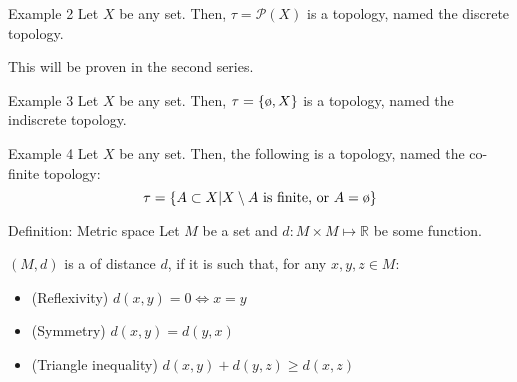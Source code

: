 \documentclass[a4paper]{article}
\begin{document}
\begin{parag}{Example 2}
    Let $X$ be any set. Then, $\tau = \mathcal{P}\left(X\right)$ is a topology, named the discrete topology.

    This will be proven in the second series.
\end{parag}

\begin{parag}{Example 3}
    Let $X$ be any set. Then, $\tau = \left\{\o, X\right\}$ is a topology, named the indiscrete topology.
\end{parag}

\begin{parag}{Example 4}
    Let $X$ be any set. Then, the following is a topology, named the co-finite topology: 
    \[\tau = \left\{A \subset X | X \setminus A \text{ is finite, or } A = \o\right\}\]
\end{parag}

\begin{parag}{Definition: Metric space}
   Let $M$ be a set and $d: M \times M \mapsto \mathbb{R}$ be some function.

   $\left(M, d\right)$ is a  of distance $d$, if it is such that, for any $x,y,z \in M$:
   \begin{itemize}
       \item (Reflexivity) $d\left(x, y\right) = 0 \iff x = y$
       \item (Symmetry) $d\left(x, y\right) = d\left(y, x\right)$
       \item (Triangle inequality) $d\left(x, y\right) + d\left(y, z\right) \geq d\left(x, z\right)$
   \end{itemize}
\end{parag}
\end{document}
